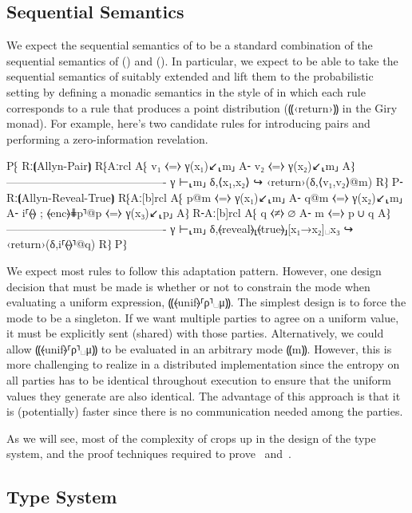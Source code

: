 \subsection{Sequential Semantics}
\label{subsec:proposal-design-seq}

We expect the sequential semantics of \lang to be a standard combination of the sequential
semantics of \mpc () and \obliv (). In particular, we
expect to be able to take the sequential semantics of \mpc suitably extended and lift them
to the probabilistic setting by defining a monadic semantics in the style of \obliv in which
each \mpc rule corresponds to a \lang rule that produces a point distribution (⸨‹return›⸩ in
the Giry monad). For example, here's two candidate rules for introducing pairs and performing
a zero-information revelation.

P⁅ Rː⦗Allyn-Pair⦘
   R⁅{Aːrcl
      A⁅ v₁ ⧼=⧽ γ(x₁)↙⸤m⸥
      A⁃ v₂ ⧼=⧽ γ(x₂)↙⸤m⸥
      A⁆}
      -------------------------------------------
      γ ⊢⸤m⸥ δ,⟨x₁,x₂⟩ ↪ ‹return›(δ,⟨v₁,v₂⟩@m)
      R⁆
P⁃ Rː⦗Allyn-Reveal-True⦘
   R⁅{Aː[b]rcl
      A⁅ p@m          ⧼=⧽ γ(x₁)↙⸤m⸥
      A⁃ q@m          ⧼=⧽ γ(x₂)↙⸤m⸥
      A⁃ i⸢⦑\faThumbsUp⦒ ; ⦑enc⦒⋕p⸣@p ⧼=⧽ γ(x₃)↙⸤p⸥
      A⁆}
   R⁃{Aː[b]rcl
      A⁅ q ⧼≠⧽ ∅
      A⁃ m ⧼=⧽ p ∪ q
      A⁆}
      -------------------------------------------
      γ ⊢⸤m⸥ δ,⦑reveal⦒⸤⦑true⦒⸥[x₁→x₂]␣x₃ ↪ ‹return›(δ,i⸢⦑\faThumbsDown⦒⸣@q)
   R⁆
P⁆

We expect most rules to follow this adaptation pattern. However, one design decision
that must be made is whether or not to constrain the mode when evaluating a uniform
expression, ⸨⦑unif⦒⸢ρ⸣␣μ⸩. The simplest design is to force the mode to be a singleton.
If we want multiple parties to agree on a uniform value, it must be explicitly sent (shared)
with those parties. Alternatively, we could allow ⸨⦑unif⦒⸢ρ⸣␣μ⸩ to be evaluated in an arbitrary
mode ⸨m⸩. However, this is more challenging to realize in a distributed implementation since the
entropy on all parties has to be identical throughout execution to ensure that the uniform values
they generate are also identical. The advantage of this approach is that it is (potentially) faster
since there is no communication needed among the parties.

As we will see, most of the complexity of \lang crops up in the design of the type system, and the
proof techniques required to prove~ and~.

\subsection{Type System}
\label{subsec:propsal-design-types}

